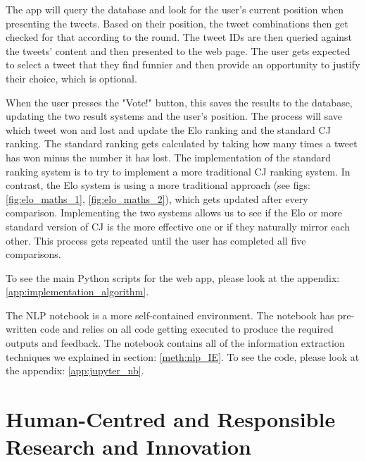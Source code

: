 	The app will query the database and look for the user's current position when presenting the tweets. Based on their position, the tweet combinations then get checked for that according to the round. The tweet IDs are then queried against the tweets' content and then presented to the web page. The user gets expected to select a tweet that they find funnier and then provide an opportunity to justify their choice, which is optional.   
	
	When the user presses the "Vote!" button, this saves the results to the database, updating the two result systems and the user's position. The process will save which tweet won and lost and update the Elo ranking and the standard CJ ranking. The standard ranking gets calculated by taking how many times a tweet has won minus the number it has lost. The implementation of the standard ranking system is to try to implement a more traditional CJ ranking system. In contrast, the Elo system is using a more traditional approach (see figs: \ref{fig:elo_maths_1}, \ref{fig:elo_maths_2}), which gets updated after every comparison. Implementing the two systems allows us to see if the Elo or more standard version of CJ is the more effective one or if they naturally mirror each other. This process gets repeated until the user has completed all five comparisons.
	
	To see the main Python scripts for the web app, please look at the appendix: \ref{app:implementation_algorithm}.
	
	The NLP notebook is a more self-contained environment. The notebook has pre-written code and relies on all code getting executed to produce the required outputs and feedback. The notebook contains all of the information extraction techniques we explained in section: \ref{meth:nlp_IE}. To see the code, please look at the appendix: \ref{app:jupyter_nb}.
	
		
	
	
	\section{Human-Centred and Responsible Research and Innovation}
	
